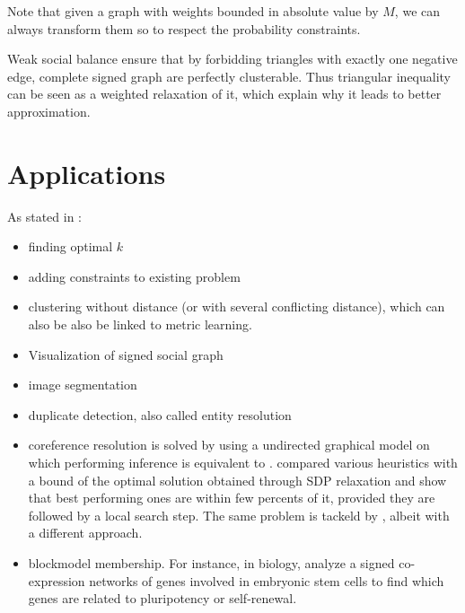 Note that given a graph with weights bounded in absolute value by $M$, we can
always transform them so to respect the probability constraints.

Weak social balance ensure that by forbidding triangles with exactly one
negative edge, complete signed graph are perfectly
clusterable\autocite{davis1967clustering}. Thus triangular inequality can be
seen as a weighted relaxation of it, which explain why it leads to better
approximation.

\section{Applications}
\label{sec:appli}
As stated in \autocite[Section 5]{Demaine2006}:
\begin{itemize}
	\item finding optimal $k$
	\item adding constraints to existing problem
	\item clustering without distance (or with several conflicting
		distance), which can also be also be linked to metric learning.
	\item Visualization of signed social graph \autocite{Luca10}
	\item image segmentation \autocites{Bagon2011}{Kim2011}
	\item duplicate detection, also called entity resolution \autocite{DeDup09}
	\item coreference resolution is solved by \textcite[Section
		2.3]{graphicalCoreference04} using a undirected graphical model on
		which performing inference is equivalent to \pcc{}.
		\Textcite{Elsner2009} compared various heuristics with a bound of the
		optimal solution obtained through SDP relaxation and show that best
		performing ones are within few percents of it, provided they are
		followed by a local search step. The same problem is tackeld
		by \textcite{Chatel14}, albeit with a different approach.
	\item blockmodel membership. For instance, in biology,
		\textcite{Mason2009} analyze a signed co-expression networks of genes
		involved in embryonic stem cells to find which genes are related to
		pluripotency or self-renewal.
\end{itemize}



